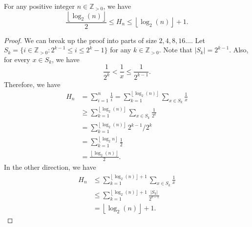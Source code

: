 \begin{lemma}
	For any positive integer \( n \in \mathbb{Z}_{>0} \), we have \[
		\frac{\left\lfloor \log _2(n) \right\rfloor}{2} \le H_n \le \left\lfloor \log _2(n) \right\rfloor + 1
	.\] 
\end{lemma}
\begin{proof}
	We can break up the proof into parts of size \( 2,4,8,16\ldots  \). Let \( S_k=\{i \in \mathbb{Z}_{>0} : 2^{k-1} \le i \le 2^{k}-1   \}   \) for any \( k \in \mathbb{Z}_{>0} \). Note that \( |S_k| = 2^{k-1}  \). Also, for every \( x \in  S_k \), we have \[
		\frac{1}{2^{k} } < \frac{1}{x} \le \frac{1}{2^{k-1} }
	.\] 
	Therefore, we have 
	\begin{align*}
		H_n &= \sum_{i=1}^{n} \frac{1}{i} = \sum_{k=1}^{\left\lfloor \log _2(n) \right\rfloor} \sum_{x \in S_k} \frac{1}{x} \\
				&\ge \sum_{k=1}^{\left\lfloor \log _2(n) \right\rfloor} \sum_{x \in S_k} \frac{1}{2^{k} } \\
		&= \sum_{k=1}^{\left\lfloor \log _2(n) \right\rfloor} 2^{k-1}/2^{k}   \\
		&= \sum_{k=1}^{\left\lfloor \log _2n \right\rfloor} \frac{1}{2} \\
		&= \frac{\left\lfloor \log _2(n) \right\rfloor}{2}
	.\end{align*}
	In the other direction, we have
	\begin{align*}
		H_n &\le \sum_{k=1}^{\left\lfloor \log _2(n) \right\rfloor+1} \sum_{x \in S_k} \frac{1}{x} \\
		&\le \sum_{k=1}^{\left\lfloor \log _2(n) \right\rfloor + 1} \frac{|S_k|}{2^{k-1} }  \\
		&= \left\lfloor \log _2(n) \right\rfloor + 1
	.\end{align*}
\end{proof}
